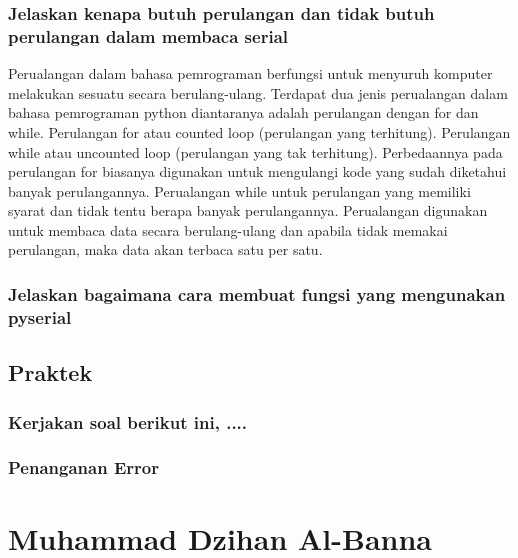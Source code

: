 \subsubsection{Jelaskan kenapa butuh perulangan dan tidak butuh perulangan dalam membaca serial}
Perualangan dalam bahasa pemrograman berfungsi untuk menyuruh komputer melakukan sesuatu secara berulang-ulang. Terdapat dua jenis perualangan dalam bahasa pemrograman python diantaranya adalah perulangan dengan for dan while.
Perulangan for atau counted loop (perulangan yang terhitung). Perulangan while atau uncounted loop (perulangan yang tak terhitung). Perbedaannya pada perulangan for biasanya digunakan untuk mengulangi kode yang sudah diketahui banyak perulangannya. Perualangan while untuk perulangan yang memiliki syarat dan tidak tentu berapa banyak perulangannya.
Perualangan digunakan untuk membaca data secara berulang-ulang  dan apabila tidak memakai perulangan, maka data akan terbaca satu per satu.

\subsubsection{Jelaskan bagaimana cara membuat fungsi yang mengunakan pyserial}


\subsection{Praktek}
\subsubsection{Kerjakan soal berikut ini, ....}
\subsubsection{Penanganan Error}

\section{Muhammad Dzihan Al-Banna}
